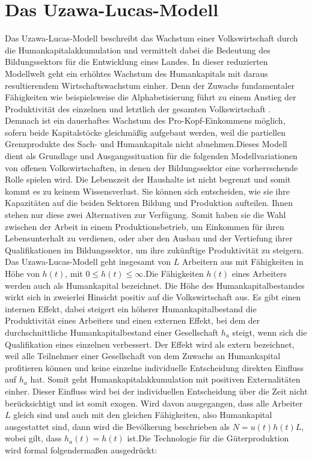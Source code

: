 \section[Das Uzawa-Lucas-Modell]{Das Uzawa-Lucas-Modell}
Das Uzawa-Lucas-Modell beschreibt das Wachstum einer Volkswirtschaft durch die Humankapitalakkumulation und vermittelt dabei die Bedeutung des Bildungssektors f{\"u}r die Entwicklung eines Landes. In dieser reduzierten Modellwelt geht ein erh{\"o}htes Wachstum des Humankapitals mit daraus resultierendem Wirtschaftswachstum einher. Denn der Zuwachs fundamentaler F{\"a}higkeiten wie beispielsweise die Alphabetisierung führt zu einem Anstieg der Produktivit{\"a}t des einzelnen und letztlich der gesamten Volkswirtschaft \citep{Romer.1990}. Demnach ist ein dauerhaftes Wachstum des Pro-Kopf-Einkommens m{\"o}glich, sofern beide Kapitalst{\"o}cke gleichm{\"a}{\ss}ig aufgebaut werden, weil die partiellen Grenzprodukte des Sach- und Humankapitals nicht abnehmen.\newline Dieses Modell dient als Grundlage und Ausgangssituation f{\"u}r die folgenden Modellvariationen von offenen Volkswirtschaften, in denen der Bildungssektor eine vorherrschende Rolle spielen wird.
Die Lebenszeit der Haushalte ist nicht begrenzt und somit kommt es zu keinem Wissensverlust. Sie k{\"o}nnen sich entscheiden, wie sie ihre Kapazit{\"a}ten auf die beiden Sektoren Bildung und Produktion aufteilen. Ihnen stehen nur diese zwei Alternativen zur Verf{\"u}gung. Somit haben sie die Wahl zwischen der Arbeit in einem Produktionsbetrieb, um Einkommen f{\"u}r ihren Lebensunterhalt zu verdienen, oder aber den Ausbau und der Vertiefung ihrer Qualifikationen im Bildungssektor, um ihre zuk{\"u}nftige Produktivit{\"a}t zu steigern.
Das Uzawa-Lucas-Modell geht insgesamt von $L$ Arbeitern aus mit F{\"a}higkeiten in H{\"o}he von $h(t)$, mit $0 \le h(t)\leq \infty$.\newline Die F{\"a}higkeiten $h(t)$ eines Arbeiters werden auch als Humankapital bezeichnet. Die H{\"o}he des Humankapitalbestandes wirkt sich in zweierlei Hinsicht positiv auf die Volkswirtschaft aus. Es gibt einen internen Effekt, dabei steigert ein h{\"o}herer Humankapitalbestand die Produktivit{\"a}t eines Arbeiters und einen externen Effekt, bei dem der durchschnittliche Humankapitalbestand einer Gesellschaft $h_a$ steigt, wenn sich die Qualifikation eines einzelnen verbessert. \newline Der Effekt wird als extern bezeichnet, weil alle Teilnehmer einer Gesellschaft von dem Zuwachs an Humankapital profitieren k{\"o}nnen und keine einzelne individuelle Entscheidung direkten Einfluss auf $h_a$ hat. Somit geht Humankapitalakkumulation mit positiven Externalitäten einher. Dieser Einfluss wird bei der individuellen Entscheidung {\"u}ber die Zeit nicht ber{\"u}cksichtigt und ist somit exogen. \newline Wird davon ausgegangen, dass alle Arbeiter $L$ gleich sind und auch mit den gleichen F{\"a}higkeiten, also Humankapital ausgestattet sind, dann wird die Bev{\"o}lkerung beschrieben als $N=u(t)h(t)L$, wobei gilt, dass $h_a(t)=h(t)$ ist.\newline Die Technologie f{\"u}r die G{\"u}terproduktion wird formal folgenderma{\ss}en ausgedr{\"u}ckt:
